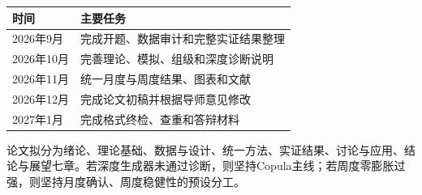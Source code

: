 \documentclass[UTF8,12pt,a4paper]{ctexart}
\begin{document}
\begin{center}
\footnotesize
\begin{tabularx}{0.96\textwidth}{p{2.6cm}Y}
\toprule
时间 & 主要任务\\
\midrule
2026年9月 & 完成开题、数据审计和完整实证结果整理\\
2026年10月 & 完善理论、模拟、组级和深度诊断说明\\
2026年11月 & 统一月度与周度结果、图表和文献\\
2026年12月 & 完成论文初稿并根据导师意见修改\\
2027年1月 & 完成格式终检、查重和答辩材料\\
\bottomrule
\end{tabularx}
\end{center}

论文拟分为绪论、理论基础、数据与设计、统一方法、实证结果、讨论与应用、结论与展望七章。若深度生成器未通过诊断，则坚持Copula主线；若周度零膨胀过强，则坚持月度确认、周度稳健性的预设分工。
\end{document}
